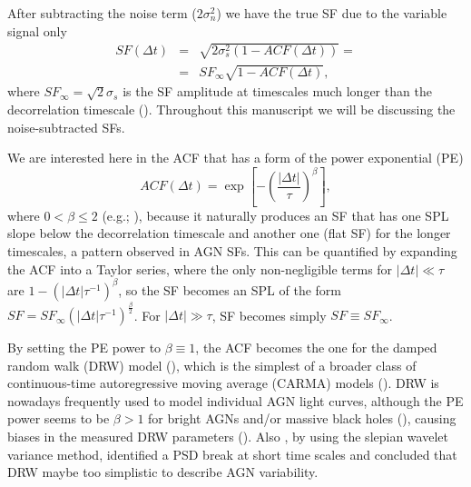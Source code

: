 \documentclass[twocolumn]{aastex6}
\begin{document}
After subtracting the noise term ($2\sigma_n^2$) we have the true SF due to the variable signal only
\begin{eqnarray}
SF(\Delta t) &=& \sqrt{2\sigma_s^2(1-ACF(\Delta t))} = \nonumber \\
			&=& SF_\infty\sqrt{1-ACF(\Delta t)},
\label{eq:simone}
\end{eqnarray}
\noindent
where $SF_\infty=\sqrt{2}\sigma_s$ is the SF amplitude at timescales much longer than the decorrelation timescale 
(\citealt{2001ApJ...555..775C,2010ApJ...721.1014M,2010MNRAS.404..931E,2015MNRAS.451.4328K}). 
Throughout this manuscript we will be discussing the noise-subtracted SFs.

We are interested here in the ACF that has a form of the power exponential (PE)
\begin{equation}
ACF(\Delta t)=\exp\left[-\left(\frac{|\Delta t|}{\tau}\right)^\beta\right],
\end{equation}
\noindent
where $0<\beta\leq 2$ (e.g.; \citealt{2013ApJ...765..106Z}), because it naturally produces an SF that has one SPL slope below the decorrelation timescale and another one
(flat SF) for the longer timescales, a pattern observed in AGN SFs. This can be quantified by expanding the ACF into a Taylor series, 
where the only non-negligible terms for $|\Delta t|\ll\tau$ are $1-(|\Delta t|\tau^{-1})^{\beta}$, so the SF becomes 
an SPL of the form $SF=SF_\infty(|\Delta t|\tau^{-1})^{\frac{\beta}{2}}$. For $|\Delta t|\gg\tau$, SF becomes simply $SF\equiv SF_\infty$. 

By setting the PE power to $\beta\equiv1$, the ACF becomes the one for the damped random walk (DRW) model (\citealt{2009ApJ...698..895K,2010ApJ...708..927K,2010ApJ...721.1014M,2011ApJ...728...26M,2012ApJ...753..106M,
2011AJ....141...93B,2012ApJ...760...51R,2011ApJ...735...80Z,2013ApJ...765..106Z,2016ApJ...819..122Z}),
which is the simplest of a broader class of continuous-time autoregressive moving average (CARMA) models (\citealt{2014ApJ...788...33K}). 
DRW is nowadays frequently used to model individual AGN light curves, although the PE power seems to be $\beta>1$ for 
bright AGNs and/or massive black holes (\citealt{2016A&A...585A.129S,2016ApJ...826..118K}), causing biases in the measured DRW parameters (\citealt{2016MNRAS.459.2787K}).
Also \cite{2014MNRAS.439..703G}, by using the slepian wavelet variance method, identified a PSD break at short time scales and
concluded that DRW maybe too simplistic to describe AGN variability.
\end{document}

